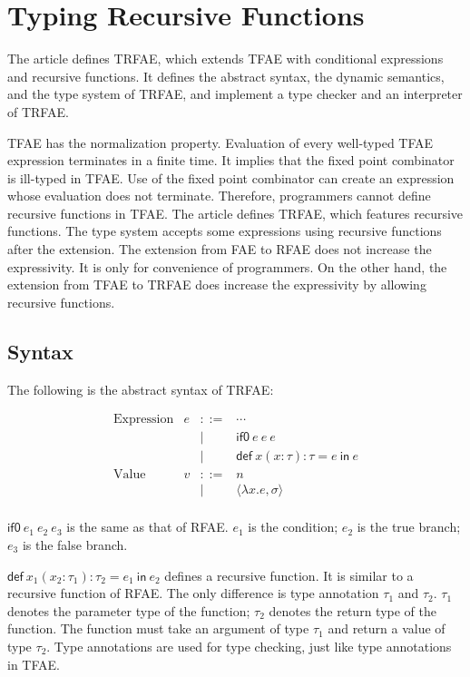 \setchapterpreamble[u]{\margintoc}
\chapter{Typing Recursive Functions}

The article defines TRFAE, which extends TFAE with conditional expressions and
recursive functions. It defines the abstract syntax, the dynamic semantics, and
the type system of TRFAE, and implement a type checker and an interpreter of
TRFAE.

TFAE has the normalization property. Evaluation of every well-typed TFAE
expression terminates in a finite time. It implies that the fixed point
combinator is ill-typed in TFAE. Use of the fixed point combinator can create an
expression whose evaluation does not terminate. Therefore, programmers cannot
define recursive functions in TFAE. The article defines TRFAE, which features
recursive functions. The type system accepts some expressions using recursive
functions after the extension. The extension from FAE to RFAE does not increase
the expressivity. It is only for convenience of programmers. On the other hand,
the extension from TFAE to TRFAE does increase the expressivity by allowing
recursive functions.

\section{Syntax}

The following is the abstract syntax of TRFAE:

\[
\begin{array}{lrcl}
\text{Expression} & e & ::= & \cdots \\
&& | & \textsf{if0}\ e\ e\ e \\
&& | & \textsf{def}\ x(x:\tau):\tau=e\ \textsf{in}\ e \\
\text{Value} & v & ::= & n \\
&& | & \langle \lambda x.e,\sigma \rangle \\
\end{array}
\]

$\textsf{if0}\ e_1\ e_2\ e_3$ is the same as that of RFAE. $e_1$ is the
condition; $e_2$ is the true branch; $e_3$ is the false branch.

$\textsf{def}\ x_1(x_2:\tau_1):\tau_2=e_1\ \textsf{in}\ e_2$ defines a recursive
function. It is similar to a recursive function of RFAE. The only difference is
type annotation $\tau_1$ and $\tau_2$. $\tau_1$ denotes the parameter type of the
function; $\tau_2$ denotes the return type of the function. The function must
take an argument of type $\tau_1$ and return a value of type $\tau_2$. Type
annotations are used for type checking, just like type annotations in TFAE.

